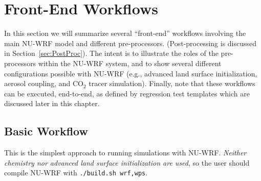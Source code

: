 \section{Front-End Workflows}
\label{sec:FrontWorkflows}

In this section we will summarize several ``front-end'' workflows involving
the main NU-WRF model and different pre-processors. (Post-processing is
discussed in Section~\ref{sec:PostProc}). The intent is to 
illustrate the roles of the pre-processors within the NU-WRF system, and to 
show several different configurations possible with NU-WRF (e.g., advanced
land surface initialization, aerosol coupling, and CO$_2$ tracer simulation).
Finally, note that these workflows can be executed, end-to-end, as defined by
regression test templates which are discussed later in this chapter.

\subsection{Basic Workflow}
\label{subsec:BasicWorkflow}

This is the simplest approach to running simulations with NU-WRF. 
\textit{Neither chemistry nor advanced land surface initialization are 
used}, so the user should compile NU-WRF with \texttt{./build.sh wrf,wps}.

